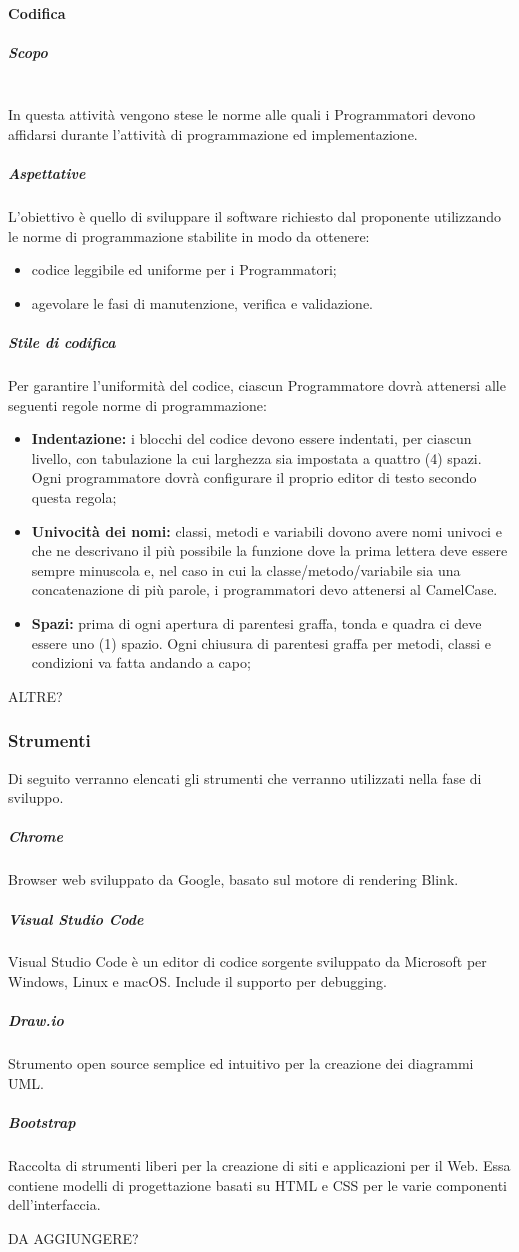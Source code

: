			\paragraph{Codifica}
				\subparagraph{Scopo \\ \\}	
					In questa attività vengono stese le norme alle quali i Programmatori devono affidarsi durante l’attività di  programmazione ed implementazione.
				\subparagraph{Aspettative}
					 L’obiettivo è quello di sviluppare il software richiesto dal proponente utilizzando le norme di programmazione stabilite in modo da ottenere:
					 	\begin{itemize}
					 	\item codice leggibile ed uniforme per i Programmatori;
					 	\item agevolare le fasi di manutenzione, verifica e validazione.
					 \end{itemize} 
				 \subparagraph{Stile di codifica}
				 	Per garantire l'uniformità del codice, ciascun Programmatore dovrà attenersi alle seguenti regole norme di programmazione: 
					\begin{itemize}
						\item \textbf{Indentazione:} i blocchi del codice devono essere indentati, per ciascun livello, con tabulazione la cui larghezza sia impostata a quattro (4) spazi. Ogni programmatore dovrà configurare il proprio editor di testo secondo questa regola;
						\item \textbf{Univocità dei nomi:} classi, metodi e variabili dovono avere nomi univoci e che ne descrivano il più possibile la funzione dove la prima lettera deve essere sempre minuscola e, nel caso in cui la classe/metodo/variabile sia una concatenazione di più parole, i programmatori devo attenersi al CamelCase.
						\item \textbf{Spazi:} prima di ogni apertura di parentesi graffa, tonda e quadra ci deve essere uno (1) spazio. Ogni chiusura di parentesi graffa per metodi, classi e condizioni va fatta andando a capo;
					\end{itemize}
					ALTRE?
					
				 
		\subsubsection{Strumenti}
			Di seguito verranno elencati gli strumenti che verranno utilizzati nella fase di sviluppo.
				\subparagraph{Chrome \\}
					Browser web sviluppato da Google, basato sul motore di rendering Blink.
				\subparagraph{Visual Studio Code \\}
					Visual Studio Code è un editor di codice sorgente sviluppato da Microsoft per Windows, Linux e macOS. Include il supporto per debugging.
				\subparagraph{Draw.io \\}
					Strumento open source semplice ed  intuitivo per la creazione dei diagrammi UML.
				\subparagraph{Bootstrap \\}
					Raccolta di strumenti liberi per la creazione di siti e applicazioni per il Web. Essa contiene modelli di progettazione basati su HTML e CSS per le varie componenti dell'interfaccia.
				
					DA AGGIUNGERE?
			